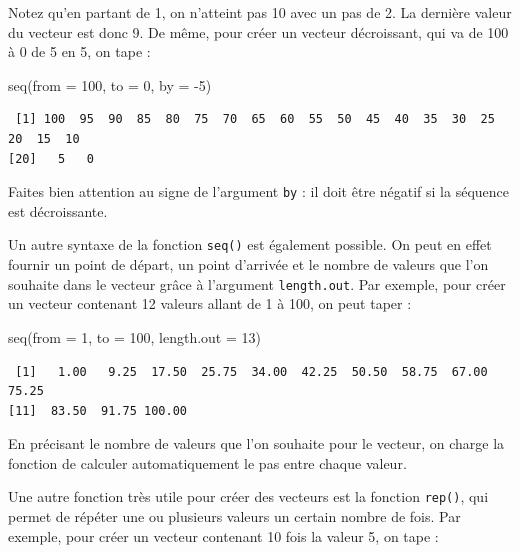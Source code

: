 \documentclass[
  a4paper,
  DIV=11,
  numbers=noendperiod,
  oneside]{scrreprt}
\newenvironment{Shaded}{}{}
\newcommand{\AttributeTok}[1]{\textcolor[rgb]{0.84,0.23,0.29}{#1}}
\newcommand{\DecValTok}[1]{\textcolor[rgb]{0.00,0.36,0.77}{#1}}
\newcommand{\FunctionTok}[1]{\textcolor[rgb]{0.44,0.26,0.76}{#1}}
\newcommand{\NormalTok}[1]{\textcolor[rgb]{0.14,0.16,0.18}{#1}}
\newcommand{\SpecialCharTok}[1]{\textcolor[rgb]{0.00,0.36,0.77}{#1}}
\begin{document}
Notez qu'en partant de 1, on n'atteint pas 10 avec un pas de 2. La
dernière valeur du vecteur est donc 9. De même, pour créer un vecteur
décroissant, qui va de 100 à 0 de 5 en 5, on tape :

\begin{Shaded}
\begin{Highlighting}[]
\FunctionTok{seq}\NormalTok{(}\AttributeTok{from =} \DecValTok{100}\NormalTok{, }\AttributeTok{to =} \DecValTok{0}\NormalTok{, }\AttributeTok{by =} \SpecialCharTok{{-}}\DecValTok{5}\NormalTok{)}
\end{Highlighting}
\end{Shaded}

\begin{verbatim}
 [1] 100  95  90  85  80  75  70  65  60  55  50  45  40  35  30  25  20  15  10
[20]   5   0
\end{verbatim}

Faites bien attention au signe de l'argument \texttt{by} : il doit être
négatif si la séquence est décroissante.

Un autre syntaxe de la fonction \texttt{seq()} est également possible.
On peut en effet fournir un point de départ, un point d'arrivée et le
nombre de valeurs que l'on souhaite dans le vecteur grâce à l'argument
\texttt{length.out}. Par exemple, pour créer un vecteur contenant 12
valeurs allant de 1 à 100, on peut taper :

\begin{Shaded}
\begin{Highlighting}[]
\FunctionTok{seq}\NormalTok{(}\AttributeTok{from =} \DecValTok{1}\NormalTok{, }\AttributeTok{to =} \DecValTok{100}\NormalTok{, }\AttributeTok{length.out =} \DecValTok{13}\NormalTok{)}
\end{Highlighting}
\end{Shaded}

\begin{verbatim}
 [1]   1.00   9.25  17.50  25.75  34.00  42.25  50.50  58.75  67.00  75.25
[11]  83.50  91.75 100.00
\end{verbatim}

En précisant le nombre de valeurs que l'on souhaite pour le vecteur, on
charge la fonction de calculer automatiquement le pas entre chaque
valeur.

Une autre fonction très utile pour créer des vecteurs est la fonction
\texttt{rep()}, qui permet de répéter une ou plusieurs valeurs un
certain nombre de fois. Par exemple, pour créer un vecteur contenant 10
fois la valeur 5, on tape :
\end{document}
